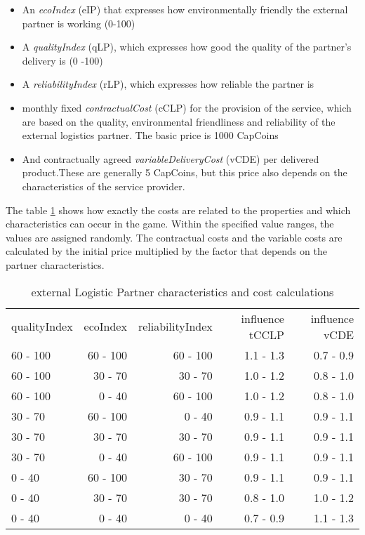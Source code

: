 \begin{itemize}
    \item An \textit{ecoIndex} (\gls{eIP}) that expresses how environmentally friendly the external partner is working (0-100)
    \item A \textit{qualityIndex} (\gls{qLP}), which expresses how good the quality of the partner's delivery is (0 -100)
    \item A \textit{reliabilityIndex} (\gls{rLP}), which expresses how reliable the partner is
    \item monthly fixed \textit{contractualCost} (\gls{cCLP}) for the provision of the service, which are based on the quality, environmental friendliness and reliability of the external logistics partner. The basic price is 1000 CapCoins 
    \item And contractually agreed \textit{variableDeliveryCost} (\gls{vCDE}) per delivered product.These are generally 5 CapCoins, but this price also depends on the characteristics of the service provider.
\end{itemize}

The table \ref{External_logistic_partner_characteristics} shows how exactly the costs are related to the properties and which characteristics can occur in the game. Within the specified value ranges, the values are assigned randomly. The contractual costs and the variable costs are calculated by the initial price multiplied by the factor that depends on the partner characteristics.

\begin{table}[ht]
    \centering
    \begin{tabular}{|l|r|r|r|r|}
    \hline
    qualityIndex & ecoIndex & reliabilityIndex & influence tCCLP & influence vCDE \\
    60 - 100      & 60 - 100   & 60 - 100  & 1.1 - 1.3    & 0.7 - 0.9     \\
    60 - 100      & 30 - 70    & 30 - 70   & 1.0 - 1.2    & 0.8 - 1.0     \\
    60 - 100      & 0 - 40     & 60 - 100  & 1.0 - 1.2    & 0.8 - 1.0     \\
    30 - 70       & 60 - 100   & 0 - 40    & 0.9 - 1.1    & 0.9 - 1.1     \\
    30 - 70       & 30 - 70    & 30 - 70   & 0.9 - 1.1    & 0.9 - 1.1     \\
    30 - 70       & 0 - 40     & 60 - 100  & 0.9 - 1.1    & 0.9 - 1.1     \\
    0 - 40        & 60 - 100   & 30 - 70   & 0.9 - 1.1    & 0.9 - 1.1     \\
    0 - 40        & 30 - 70    & 30 - 70   & 0.8 - 1.0    & 1.0 - 1.2     \\
    0 - 40        & 0 - 40     & 0 - 40    & 0.7 - 0.9    & 1.1 - 1.3     \\
    \hline
    \end{tabular}
    \caption{external Logistic Partner characteristics and cost calculations}
    \label{External_logistic_partner_characteristics}
\end{table}

